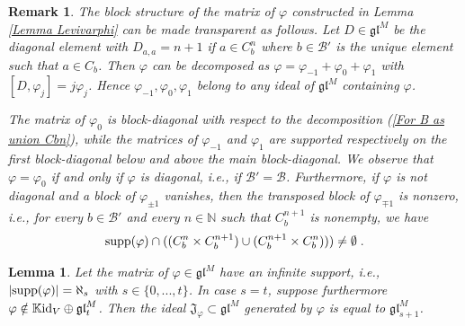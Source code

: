 \documentclass[12pt]{article}
\def\KK {{\mathbb K}}     %
\def\NN {{\mathbb N}}     %
\def\B  {\mathcal B}
\def\mk {\mathfrak}
\newtheorem{lemma}[theorem]{Lemma}
\newtheorem{rem}{Remark}[section]
\begin{document}
\begin{rem}\label{Rem Diag or Blocks}
The block structure of the matrix of $\varphi$ constructed in Lemma \ref{Lemma Levivarphi} can be made transparent as follows. Let $D\in\mk{gl}^M$ be the diagonal element with $D_{a,a}=n+1$ if $a\in C_b^n$ where $b\in\B'$ is the unique element such that $a\in C_b$. Then $\varphi$ can be decomposed as $\varphi=\varphi_{-1}+\varphi_0+\varphi_1$ with $[D,\varphi_j]=j\varphi_j$. Hence $\varphi_{-1},\varphi_0,\varphi_1$ belong to any ideal of $\mk{gl}^M$ containing $\varphi$.

The matrix of $\varphi_0$ is block-diagonal with respect to the decomposition (\ref{For B as union Cbn}), while the matrices of $\varphi_{-1}$ and $\varphi_1$ are supported respectively on the first block-diagonal below and above the main block-diagonal. We observe that $\varphi=\varphi_0$ if and only if $\varphi$ is diagonal, i.e., if $\B'=\B$. Furthermore, if $\varphi$ is not diagonal and a block of $\varphi_{\pm1}$ vanishes, then the transposed block of $\varphi_{\mp1}$ is nonzero, i.e., for every $b\in\B'$ and every $n\in\NN$ such that $C_b^{n+1}$ is nonempty, we have
\begin{gather}\label{For supp varphi nil blocks}
{\rm supp}(\varphi)\cap ((C_b^n\times C_b^{n+1})\cup(C_b^{n+1}\times C_b^n)))\ne \emptyset \;.
\end{gather}
\end{rem}

\begin{lemma}\label{Lemma Ideal of varphi}
Let the matrix of $\varphi\in\mk{gl}^M$ have an infinite support, i.e., $|{\rm supp}(\varphi)|=\aleph_s$ with $s\in\{0,...,t\}$. In case $s=t$, suppose furthermore $\varphi\notin\KK{\rm id}_V\oplus\mk{gl}^M_{t}$. Then the ideal $\mk J_\varphi\subset \mk{gl}^M$ generated by $\varphi$ is equal to $\mk{gl}^M_{s+1}$.
\end{lemma}
\end{document}
